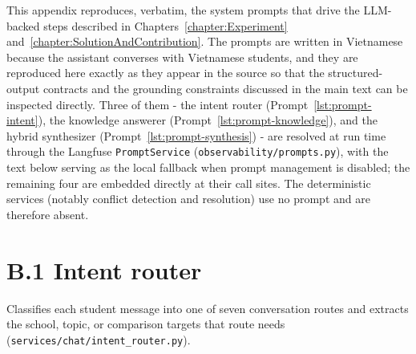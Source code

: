 \documentclass[../main.tex]{subfiles}
\begin{document}
This appendix reproduces, verbatim, the system prompts that drive the \gls{LLM}-backed steps described in Chapters~\ref{chapter:Experiment} and~\ref{chapter:SolutionAndContribution}.
The prompts are written in Vietnamese because the assistant converses with Vietnamese students, and they are reproduced here exactly as they appear in the source so that the structured-output contracts and the grounding constraints discussed in the main text can be inspected directly.
Three of them - the intent router (Prompt~\ref{lst:prompt-intent}), the knowledge answerer (Prompt~\ref{lst:prompt-knowledge}), and the hybrid synthesizer (Prompt~\ref{lst:prompt-synthesis}) - are resolved at run time through the Langfuse \texttt{PromptService} (\texttt{observability/prompts.py}), with the text below serving as the local fallback when prompt management is disabled; the remaining four are embedded directly at their call sites.
The deterministic services (notably conflict detection and resolution) use no prompt and are therefore absent.

\section*{B.1 Intent router}

Classifies each student message into one of seven conversation routes and extracts the school, topic, or comparison targets that route needs (\texttt{services/chat/intent\_router.py}).
\end{document}
